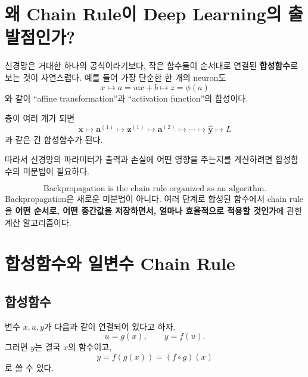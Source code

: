 \documentclass[11pt,a4paper]{article}
\newcommand{\vect}[1]{\bm{#1}}
\begin{document}
\tableofcontents
\newpage

\section{왜 Chain Rule이 Deep Learning의 출발점인가?}

신경망은 거대한 하나의 공식이라기보다, 작은 함수들이 순서대로 연결된 \textbf{합성함수}로 보는 것이 자연스럽다.
예를 들어 가장 단순한 한 개의 neuron도
\[
x \longmapsto a=wx+b \longmapsto z=\phi(a)
\]
와 같이 ``affine transformation''과 ``activation function''의 합성이다.

층이 여러 개가 되면
\[
\vect{x}
\longmapsto \vect{a}^{(1)}
\longmapsto \vect{z}^{(1)}
\longmapsto \vect{a}^{(2)}
\longmapsto \cdots
\longmapsto \widehat{\vect{y}}
\longmapsto L
\]
과 같은 긴 합성함수가 된다.

따라서 신경망의 파라미터가 출력과 손실에 어떤 영향을 주는지를 계산하려면
합성함수의 미분법이 필요하다.

\begin{mlbox}[핵심 관점]
\[
\boxed{\text{Backpropagation is the chain rule organized as an algorithm.}}
\]
Backpropagation은 새로운 미분법이 아니다. 여러 단계로 합성된 함수에서 chain rule을
\textbf{어떤 순서로, 어떤 중간값을 저장하면서, 얼마나 효율적으로 적용할 것인가}에 관한 계산 알고리즘이다.
\end{mlbox}

\section{합성함수와 일변수 Chain Rule}

\subsection{합성함수}

변수 $x,u,y$가 다음과 같이 연결되어 있다고 하자.
\[
u=g(x), \qquad y=f(u).
\]
그러면 $y$는 결국 $x$의 함수이고,
\[
y=f(g(x))=(f\circ g)(x)
\]
로 쓸 수 있다.

\begin{center}
\end{center}
\end{document}
